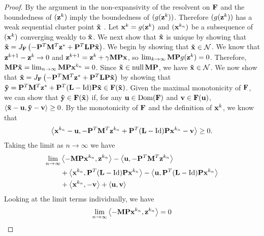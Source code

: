 \begin{proof}
By the argument in \cite[Appendix 1, Theorem 1, Eq. 64-68]{bassett2024optimaldesignresolventsplitting} the non-expansivity of the resolvent on $\mathbf{F}$ and the boundedness of $(\mathbf{z}^k)$ imply the boundedness of $(g(\mathbf{z}^k))$.
Therefore $(g(\mathbf{z}^k))$ has a weak sequential cluster point $\mathbf{\tilde{x}}$ \cite[Fact 2.27]{bauschke_combettes}.
Let $\mathbf{x}^k = g(\mathbf{z}^k)$ and $(\mathbf{x}^{k_n})$ be a subsequence of $(\mathbf{x}^k)$ converging weakly to $\mathbf{\tilde{x}}$.
We next show that $\mathbf{\tilde{x}}$ is unique by showing that $\mathbf{\tilde{x}} = J_{\mathbf{F}}\left(-\mathbf{P}^T \mathbf{M}^T \mathbf{z}^* + \mathbf{P}^T \mathbf{L}\mathbf{P}\mathbf{\tilde{x}}\right)$.
We begin by showing that $\mathbf{\tilde{x}} \in \mathcal{N}$.
We know that $\mathbf{z}^{k+1} - \mathbf{z}^k \to 0$ and $\mathbf{z}^{k+1} = \mathbf{z}^k + \gamma \mathbf{M} \mathbf{P}\mathbf{x}$, so $\lim_{k\to\infty} \mathbf{M}\mathbf{P}g(\mathbf{z}^k) = 0$.
Therefore, $\mathbf{M}\mathbf{P}\mathbf{\tilde{x}} = \lim_{n \to \infty} \mathbf{M}\mathbf{P}\mathbf{x}^{k_n} = 0$.
Since $\mathbf{\tilde{x}} \in \operatorname{null}{\mathbf{M}\mathbf{P}}$, we have $\mathbf{\tilde{x}} \in \mathcal{N}$.
We now show that $\mathbf{\tilde{x}} = J_{\mathbf{F}}\left(-\mathbf{P}^T \mathbf{M}^T \mathbf{z}^* + \mathbf{P}^T \mathbf{L}\mathbf{P}\mathbf{\tilde{x}}\right)$ by showing that $\mathbf{\tilde{y}} = \mathbf{P}^T \mathbf{M}^T \mathbf{z}^* + \mathbf{P}^T(\mathbf{L} - \mathrm{Id})\mathbf{P}\mathbf{\tilde{x}} \in \mathbf{F}(\mathbf{\tilde{x}})$.
Given the maximal monotonicity of $\mathbf{F}$, we can show that $\mathbf{\tilde{y}} \in \mathbf{F}(\mathbf{\tilde{x}})$ if, for any $\mathbf{u} \in \text{Dom}(\mathbf{F})$ and $\mathbf{v} \in \mathbf{F}(\mathbf{u})$, $\left\langle \mathbf{\tilde{x}} - \mathbf{u}, \mathbf{\tilde{y}} - \mathbf{v} \right\rangle \geq 0$.
By the monotonicity of $\mathbf{F}$ and the definition of $\mathbf{x}^k$, we know that
\begin{equation}
    \left\langle \mathbf{x}^{k_n} - \mathbf{u}, -\mathbf{P}^T \mathbf{M}^T \mathbf{z}^{k_n} + \mathbf{P}^T(\mathbf{L} - \mathrm{Id})\mathbf{P}\mathbf{x}^{k_n} - \mathbf{v}\right\rangle \geq 0.
\end{equation}
Taking the limit as $n \to \infty$ we have 
\begin{align}
    \lim_{n \to \infty} &\left\langle -\mathbf{M}\mathbf{P}\mathbf{x}^{k_n}, \mathbf{z}^{k_n} \right\rangle - \left\langle \mathbf{u}, -\mathbf{P}^T \mathbf{M}^T \mathbf{z}^{k_n} \right\rangle \\
    &+ \left\langle \mathbf{x}^{k_n} , \mathbf{P}^T (\mathbf{L} - \mathrm{Id}) \mathbf{P} \mathbf{x}^{k_n} \right\rangle - \left\langle \mathbf{u} , \mathbf{P}^T (\mathbf{L} - \mathrm{Id}) \mathbf{P} \mathbf{x}^{k_n} \right\rangle \\
    & + \left\langle \mathbf{x}^{k_n} , -\mathbf{v} \right\rangle + \langle \mathbf{u}, \mathbf{v} \rangle
\end{align}
Looking at the limit terms individually, we have
\begin{align}
    \lim_{n \to \infty} \left\langle -\v{M}\v{P}\v{x}^{k_n}, \v{z}^{k_n} \right\rangle &= 0 \label{lim_1}\\

\end{align}
\end{proof}
